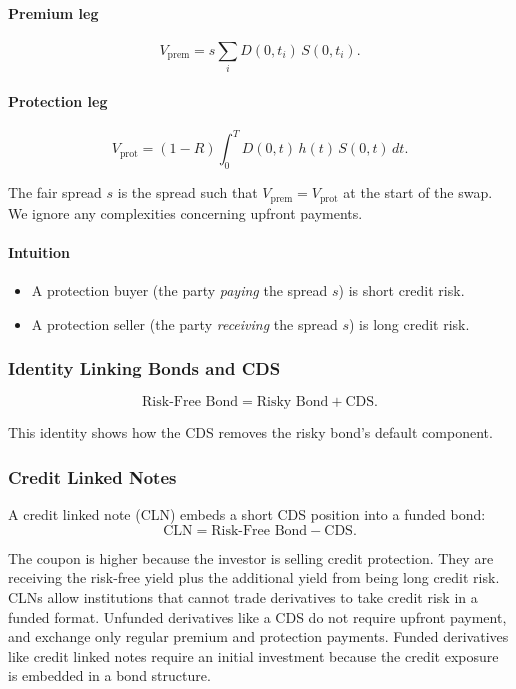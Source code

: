 \paragraph{Premium leg}
\[
V_{\text{prem}} = s \sum_{i} D(0,t_i)\,S(0,t_i).
\]

\paragraph{Protection leg}
\[
V_{\text{prot}} = (1-R)\int_0^T D(0,t)\,h(t)\,S(0,t)\,dt.
\]

The fair spread $s$ is the spread such that $V_{\text{prem}} = V_{\text{prot}}$ at the start of the swap. We ignore any complexities concerning upfront payments. 

\paragraph{Intuition}
\begin{itemize}
    \item A protection buyer (the party \emph{paying} the spread $s$) is short credit risk.
    \item A protection seller (the party \emph{receiving} the spread $s$) is long credit risk.
\end{itemize}

\subsubsection*{Identity Linking Bonds and CDS}

\[
\text{Risk-Free Bond} = \text{Risky Bond} + \text{CDS}.
\]

This identity shows how the CDS removes the risky bond’s default component.

\subsubsection*{Credit Linked Notes}

A credit linked note (CLN) embeds a short CDS position into a funded bond:
\[
\text{CLN} = \text{Risk-Free Bond} - \text{CDS}.
\]

The coupon is higher because the investor is selling credit protection. They are receiving the risk-free yield plus the additional yield from being long credit risk. CLNs allow institutions that cannot trade derivatives to take credit risk in a funded format. Unfunded derivatives like a CDS do not require upfront payment, and exchange only regular premium and protection payments. Funded derivatives like credit linked notes require an initial investment because the credit exposure is embedded in a bond structure.

